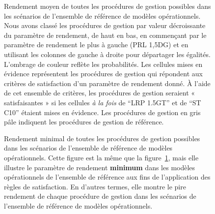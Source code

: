 \documentclass[french,11pt]{book}
\begin{document}
\begin{figure}[htb]

{\centering {} 

}

\caption{Rendement moyen de toutes les procédures de gestion possibles dans les scénarios de l'ensemble de référence de modèles opérationnels. Nous avons classé les procédures de gestion par valeur décroissante du paramètre de rendement, de haut en bas, en commençant par le paramètre de rendement le plus à gauche (PRL 1,5DG) et en utilisant les colonnes de gauche à droite pour départager les égalités. L'ombrage de couleur reflète les probabilités. Les cellules mises en évidence représentent les procédures de gestion qui répondent aux critères de satisfaction d'un paramètre de rendement donné. À l'aide de cet ensemble de critères, les procédures de gestion seraient « satisfaisantes » si les cellules \emph{à la fois} de ``LRP 1.5GT'' et de ``ST C10'' étaient mises en évidence. Les procédures de gestion en gris pâle indiquent les procédures de gestion de référence.}\label{fig:tigure-avg}
\end{figure}

\begin{figure}[htb]

{\centering {} 

}

\caption{Rendement minimal de toutes les procédures de gestion possibles dans les scénarios de l'ensemble de référence de modèles opérationnels. Cette figure est la même que la figure~\ref{fig:tigure-avg}, mais elle illustre le paramètre de rendement \textbf{minimum} dans les modèles opérationnels de l'ensemble de référence aux fins de l'application des règles de satisfaction. En d'autres termes, elle montre le pire rendement de chaque procédure de gestion dans les scénarios de l'ensemble de référence de modèles opérationnels.}\label{fig:tigure-min}
\end{figure}
\clearpage
\end{document}
